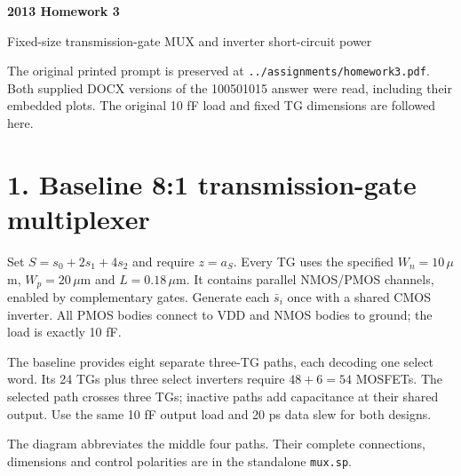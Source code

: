 \documentclass[11pt,a4paper]{article}
\begin{document}
\begin{center}{\Large\bfseries 2013 Homework 3}\par Fixed-size transmission-gate MUX and inverter short-circuit power\end{center}
The original printed prompt is preserved at \texttt{../assignments/homework3.pdf}.
Both supplied DOCX versions of the 100501015 answer were read, including their
embedded plots. The original 10 fF load and fixed TG dimensions are followed here.

\section*{1. Baseline 8:1 transmission-gate multiplexer}
Set $S=s_0+2s_1+4s_2$ and require $z=a_S$. Every TG uses the specified
$W_n=10\,\mu$m, $W_p=20\,\mu$m and $L=0.18\,\mu$m. It contains parallel
NMOS/PMOS channels, enabled by complementary gates. Generate each $\bar s_i$
once with a shared CMOS inverter. All PMOS bodies connect to VDD and NMOS
bodies to ground; the load is exactly 10 fF.

The baseline provides eight separate three-TG paths, each decoding one select
word. Its 24 TGs plus three select inverters require $48+6=54$ MOSFETs.
The selected path crosses three TGs; inactive paths add capacitance at their
shared output. Use the same 10 fF output load and 20 ps data slew for both designs.

\begin{center}\end{center}
The diagram abbreviates the middle four paths. Their complete connections,
dimensions and control polarities are in the standalone \texttt{mux.sp}.
\end{document}
